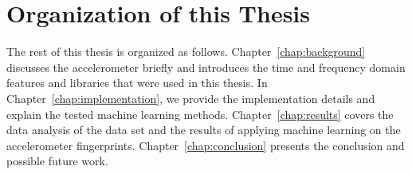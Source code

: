 \section{Organization of this Thesis}
\label{ch:organizationofthisthesis}
The rest of this thesis is organized as follows. Chapter~\ref{chap:background} discusses the accelerometer briefly and introduces the time and frequency domain features and libraries that were used in this thesis. In Chapter~\ref{chap:implementation}, we provide the implementation details and explain the tested machine learning methods. Chapter~\ref{chap:results} covers the data analysis of the data set and the results of applying machine learning on the accelerometer fingerprints. Chapter~\ref{chap:conclusion} presents the conclusion and possible future work.
\clearpage